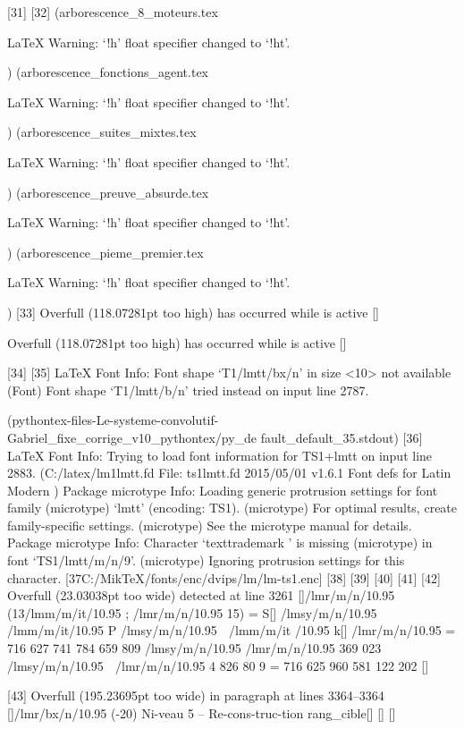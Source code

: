 [31] [32] (arborescence_8_moteurs.tex

LaTeX Warning: `!h' float specifier changed to `!ht'.

) (arborescence_fonctions_agent.tex

LaTeX Warning: `!h' float specifier changed to `!ht'.

) (arborescence_suites_mixtes.tex

LaTeX Warning: `!h' float specifier changed to `!ht'.

) (arborescence_preuve_absurde.tex

LaTeX Warning: `!h' float specifier changed to `!ht'.

) (arborescence_pieme_premier.tex

LaTeX Warning: `!h' float specifier changed to `!ht'.

) [33]
Overfull \vbox (118.07281pt too high) has occurred while \output is active []


Overfull \vbox (118.07281pt too high) has occurred while \output is active []


[34] [35]
LaTeX Font Info:    Font shape `T1/lmtt/bx/n' in size <10> not available
(Font)              Font shape `T1/lmtt/b/n' tried instead on input line 2787.

(pythontex-files-Le-systeme-convolutif-Gabriel_fixe_corrige_v10_pythontex/py_de
fault_default_35.stdout) [36]
LaTeX Font Info:    Trying to load font information for TS1+lmtt on input line 
2883.
 (C:\MikTeX\tex/latex/lm\ts1lmtt.fd
File: ts1lmtt.fd 2015/05/01 v1.6.1 Font defs for Latin Modern
)
Package microtype Info: Loading generic protrusion settings for font family
(microtype)             `lmtt' (encoding: TS1).
(microtype)             For optimal results, create family-specific settings.
(microtype)             See the microtype manual for details.
Package microtype Info: Character `texttrademark ' is missing
(microtype)             in font `TS1/lmtt/m/n/9'.
(microtype)             Ignoring protrusion settings for this character.
 [37{C:/MikTeX/fonts/enc/dvips/lm/lm-ts1.enc}] [38] [39] [40] [41] [42]
Overfull \hbox (23.03038pt too wide) detected at line 3261
[]/lmr/m/n/10.95 (13\OML/lmm/m/it/10.95 ; /lmr/m/n/10.95 15) = S[] \OMS
/lmsy/m/n/10.95 ^^@ \OML/lmm/m/it/10.95 P \OMS/lmsy/m/n/10.95 ^^B \OML/lmm/m/it
/10.95 k[] /lmr/m/n/10.95 = 716 627 741 784 659 809 \OMS/lmsy/m/n/10.95 ^^@
 /lmr/m/n/10.95 369 023 \OMS/lmsy/m/n/10.95 ^^B /lmr/m/n/10.95 4 826 80
9 = 716 625 960 581 122 202
 []

[43]
Overfull \hbox (195.23695pt too wide) in paragraph at lines 3364--3364
 []/lmr/bx/n/10.95 (-20) Ni-veau 5 -- Re-cons-truc-tion rang_cible[] [] 
 []

